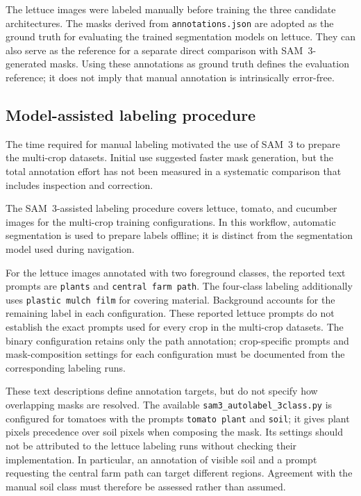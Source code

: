 The lettuce images were labeled manually before training the three
candidate architectures. The masks derived from
\texttt{annotations.json} are adopted as the ground truth for evaluating
the trained segmentation models on lettuce. They can also serve as the
reference for a separate direct comparison with SAM~3-generated masks.
Using these annotations as ground truth defines the evaluation reference;
it does not imply that manual annotation is intrinsically error-free.

\subsection{Model-assisted labeling procedure}
\label{subsec:c3_assisted_annotation}

The time required for manual labeling motivated the use of SAM~3 to
prepare the multi-crop datasets. Initial use suggested faster mask
generation, but the total annotation effort has not been measured in a
systematic comparison that includes inspection and correction.

The SAM~3-assisted labeling procedure covers lettuce, tomato, and
cucumber images for the multi-crop training configurations. In this
workflow, automatic segmentation is used to prepare labels offline; it
is distinct from the segmentation model used during navigation.

For the lettuce images annotated with two foreground classes, the reported
text prompts are \texttt{plants} and \texttt{central farm path}. The
four-class labeling additionally uses \texttt{plastic mulch film} for
covering material. Background accounts for the remaining label in each
configuration. These reported lettuce prompts do not establish the exact
prompts used for every crop in the multi-crop datasets. The binary
configuration retains only the path annotation; crop-specific prompts
and mask-composition settings for each configuration must be documented
from the corresponding labeling runs.

These text descriptions define annotation targets, but do not specify
how overlapping masks are resolved. The available
\texttt{sam3\_\allowbreak autolabel\_\allowbreak 3class.py} is configured
for tomatoes with the prompts \texttt{tomato plant} and \texttt{soil};
it gives plant pixels precedence over soil pixels when composing the
mask. Its settings should not be attributed to the lettuce labeling
runs without checking their implementation. In particular, an annotation
of visible soil and a prompt requesting the central farm path can target
different regions. Agreement with the manual soil class must therefore
be assessed rather than assumed.

